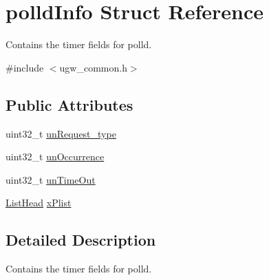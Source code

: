 \hypertarget{structpolldInfo}{\section{polld\-Info Struct Reference}
\label{structpolldInfo}
}


Contains the timer fields for polld.  




{\ttfamily \#include $<$ugw\-\_\-common.\-h$>$}

\subsection*{Public Attributes}
\begin{DoxyCompactItemize}
\item 
uint32\-\_\-t \hyperlink{structpolldInfo_acf3be94a68302552eed37fe8ab74ee07}{un\-Request\-\_\-type}
\item 
uint32\-\_\-t \hyperlink{structpolldInfo_aa560623f9e58a960842720b570f7ca78}{un\-Occurrence}
\item 
uint32\-\_\-t \hyperlink{structpolldInfo_a0574a5c222aea42a88fea3fe8360f910}{un\-Time\-Out}
\item 
\hyperlink{group__LIBHELP_ga73f73d414f252ff46652f16495641187}{List\-Head} \hyperlink{structpolldInfo_a8613886ff61c141e5d5e36b2d40f709d}{x\-Plist}
\end{DoxyCompactItemize}


\subsection{Detailed Description}
Contains the timer fields for polld. 

